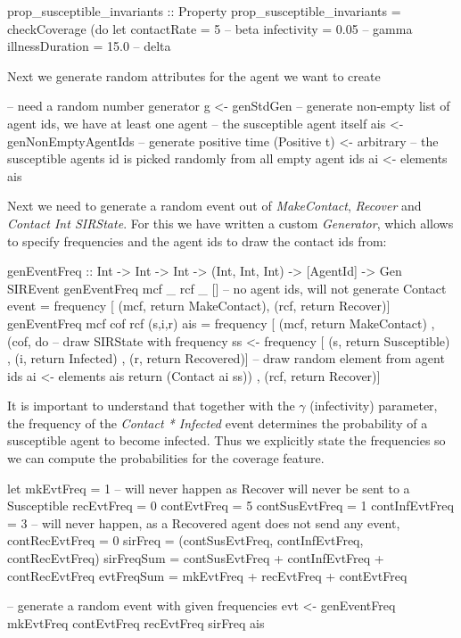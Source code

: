 \begin{HaskellCode}
prop_susceptible_invariants :: Property
prop_susceptible_invariants = checkCoverage (do
  let contactRate     = 5     -- beta
      infectivity     = 0.05  -- gamma
      illnessDuration = 15.0  -- delta
\end{HaskellCode}

Next we generate random attributes for the agent we want to create

\begin{HaskellCode}
-- need a random number generator
g <- genStdGen
-- generate non-empty list of agent ids, we have at least one agent
-- the susceptible agent itself
ais <- genNonEmptyAgentIds
-- generate positive time
(Positive t) <- arbitrary
-- the susceptible agents id is picked randomly from all empty agent ids
ai <- elements ais 
\end{HaskellCode}

Next we need to generate a random event out of \textit{MakeContact}, \textit{Recover} and \textit{Contact Int SIRState}. For this we have written a custom \textit{Generator}, which allows to specify frequencies and the agent ids to draw the contact ids from:

\begin{HaskellCode}
genEventFreq :: Int -> Int -> Int -> (Int, Int, Int) -> [AgentId] -> Gen SIREvent
genEventFreq mcf _ rcf _ []  
  -- no agent ids, will not generate Contact event
  = frequency [ (mcf, return MakeContact), (rcf, return Recover)]
genEventFreq mcf cof rcf (s,i,r) ais
  = frequency [ (mcf, return MakeContact)
              , (cof, do
                  -- draw SIRState with frequency 
                  ss <- frequency [ (s, return Susceptible)
                                  , (i, return Infected)
                                  , (r, return Recovered)]
                  -- draw random element from agent ids
                  ai <- elements ais
                  return (Contact ai ss))
              , (rcf, return Recover)]
\end{HaskellCode}

It is important to understand that together with the $\gamma$ (infectivity) parameter, the frequency of the \textit{Contact * Infected} event determines the probability of a susceptible agent to become infected. Thus we explicitly state the frequencies so we can compute the probabilities for the coverage feature.

\begin{HaskellCode}
let mkEvtFreq = 1
    -- will never happen as Recover will never be sent to a Susceptible
    recEvtFreq = 0
    contEvtFreq = 5
    contSusEvtFreq = 1
    contInfEvtFreq = 3
    -- will never happen, as a Recovered agent does not send any event,
    contRecEvtFreq = 0
    sirFreq    = (contSusEvtFreq, contInfEvtFreq, contRecEvtFreq)
    sirFreqSum = contSusEvtFreq + contInfEvtFreq + contRecEvtFreq
    evtFreqSum = mkEvtFreq + recEvtFreq + contEvtFreq
    
-- generate a random event with given frequencies
evt <- genEventFreq mkEvtFreq contEvtFreq recEvtFreq sirFreq ais
\end{HaskellCode}

